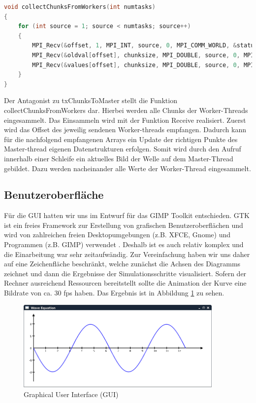 \begin{lstlisting}[language=C]
void collectChunksFromWorkers(int numtasks)
{
	for (int source = 1; source < numtasks; source++)
	{
		MPI_Recv(&offset, 1, MPI_INT, source, 0, MPI_COMM_WORLD, &status);
		MPI_Recv(&oldval[offset], chunksize, MPI_DOUBLE, source, 0, MPI_COMM_WORLD, 	&status);
		MPI_Recv(&values[offset], chunksize, MPI_DOUBLE, source, 0, MPI_COMM_WORLD, 	&status);
	}
}
\end{lstlisting}

Der Antagonist zu txChunksToMaster stellt die Funktion collectChunksFromWorkers dar. Hierbei werden alle Chunks der Worker-Threads eingesammelt. Das Einsammeln wird mit der Funktion Receive realisiert. Zuerst wird das Offset des jeweilig sendenen Worker-threads empfangen. Dadurch kann für die nachfolgend empfangenen Arrays ein Update der richtigen Punkte des Master-thread eigenen Datenstrukturen erfolgen. Somit wird durch den Aufruf innerhalb einer Schleife ein aktuelles Bild der Welle auf dem Master-Thread gebildet. Dazu werden nacheinander alle Werte der Worker-Thread eingesammelt.


\subsection{Benutzeroberfläche}
Für die GUI hatten wir uns im Entwurf für das GIMP Toolkit entschieden. GTK ist ein freies Framework zur Erstellung von grafischen Benutzeroberflächen und wird von zahlreichen freien Desktopumgebungen (z.B. XFCE, Gnome) und Programmen (z.B. GIMP) verwendet \cite{GTKMain}\cite{GTKSuccess}. Deshalb ist es auch relativ komplex und die Einarbeitung war sehr zeitaufwändig. Zur Vereinfachung haben wir uns daher auf eine Zeichenfläche beschränkt, welche zunächst die Achsen des Diagramms zeichnet und dann die Ergebnisse der Simulationsschritte visualisiert. Sofern der Rechner ausreichend Ressourcen bereitstellt sollte die Animation der Kurve eine Bildrate von ca. 30 fps haben. Das Ergebnis ist in Abbildung \ref{fig:gui} zu sehen.

\begin{figure}[H]
	\centering
	\includegraphics[width=0.9\textwidth]{pictures/gui}
	\caption{Graphical User Interface (GUI)}
	\label{fig:gui}
\end{figure}